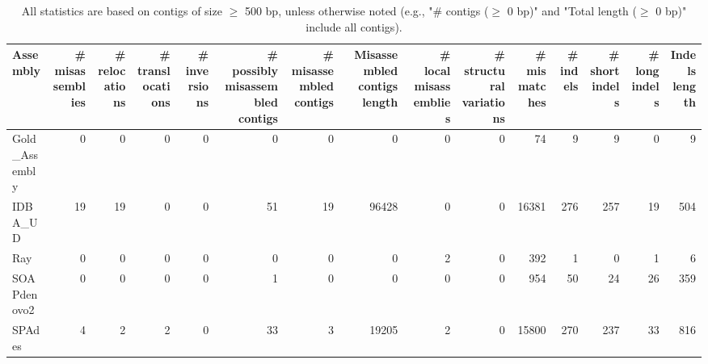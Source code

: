 \documentclass[12pt,a4paper]{article}
\begin{document}
\begin{table}[ht]
\begin{center}
\caption{All statistics are based on contigs of size $\geq$ 500 bp, unless otherwise noted (e.g., "\# contigs ($\geq$ 0 bp)" and "Total length ($\geq$ 0 bp)" include all contigs).}
\begin{tabular}{|l*{14}{|r}|}
\hline
Assembly & \# misassemblies &     \# relocations &     \# translocations &     \# inversions & \# possibly misassembled contigs & \# misassembled contigs & Misassembled contigs length & \# local misassemblies & \# structural variations & \# mismatches & \# indels &     \# short indels &     \# long indels & Indels length \\ \hline
Gold\_Assembly & 0 & 0 & 0 & 0 & 0 & 0 & 0 & 0 & 0 & 74 & 9 & 9 & 0 & 9 \\ \hline
IDBA\_UD & 19 & 19 & 0 & 0 & 51 & 19 & 96428 & 0 & 0 & 16381 & 276 & 257 & 19 & 504 \\ \hline
Ray & 0 & 0 & 0 & 0 & 0 & 0 & 0 & 2 & 0 & 392 & 1 & 0 & 1 & 6 \\ \hline
SOAPdenovo2 & 0 & 0 & 0 & 0 & 1 & 0 & 0 & 0 & 0 & 954 & 50 & 24 & 26 & 359 \\ \hline
SPAdes & 4 & 2 & 2 & 0 & 33 & 3 & 19205 & 2 & 0 & 15800 & 270 & 237 & 33 & 816 \\ \hline
\end{tabular}
\end{center}
\end{table}
\end{document}
